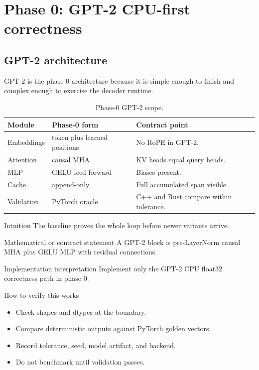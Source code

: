 \part{Phase 0: GPT-2 CPU-first correctness}

\chapter{GPT-2 architecture}
\label{ch:gpt2-architecture}
GPT-2 is the phase-0 architecture because it is simple enough to finish and complex enough to exercise the decoder runtime. \citep{radford2019gpt2}

\begin{table}[htbp]\centering\small
\begin{tabularx}{\textwidth}{L{0.22\textwidth}L{0.25\textwidth}Y}
\toprule
Module & Phase-0 form & Contract point \\
\midrule
Embeddings & token plus learned positions & No RoPE in GPT-2. \\
Attention & causal MHA & KV heads equal query heads. \\
MLP & GELU feed-forward & Biases present. \\
Cache & append-only & Full accumulated span visible. \\
Validation & PyTorch oracle & C++ and Rust compare within tolerance. \\
\bottomrule
\end{tabularx}
\caption{Phase-0 GPT-2 scope.}
\end{table}

\begin{intuitionbox}{Intuition}
The baseline proves the whole loop before newer variants arrive.
\end{intuitionbox}

\begin{definitionbox}{Mathematical or contract statement}
A GPT-2 block is pre-LayerNorm causal MHA plus GELU MLP with residual connections.
\end{definitionbox}

\begin{implementationbox}{Implementation interpretation}
Implement only the GPT-2 CPU float32 correctness path in phase 0.
\end{implementationbox}

\begin{verificationbox}{How to verify this works}
\begin{itemize}
\item Check shapes and dtypes at the boundary.
\item Compare deterministic outputs against PyTorch golden vectors.
\item Record tolerance, seed, model artifact, and backend.
\item Do not benchmark until validation passes.
\end{itemize}
\end{verificationbox}

